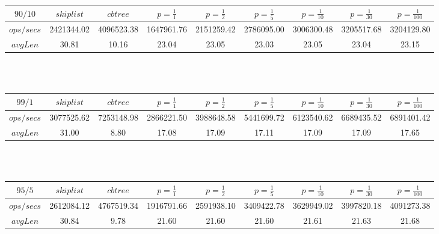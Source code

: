 \begin{tabular}{|c|c|c|c|c|c|c|c|c|}
$90/10$ & $skiplist$ & $cbtree$ & $p=\frac{1}{1}$ & $p=\frac{1}{2}$ & $p=\frac{1}{5}$ & $p=\frac{1}{10}$ & $p=\frac{1}{30}$ & $p=\frac{1}{100}$\\\hline
$ops/secs$ & 2421344.02 & 4096523.38 & 1647961.76 & 2151259.42 & 2786095.00 & 3006300.48 & 3205517.68 & 3204129.80\\\hline
$avgLen$ & 30.81 & 10.16 & 23.04 & 23.05 & 23.03 & 23.05 & 23.04 & 23.15\\\hline
\end{tabular}
\\\\
\begin{tabular}{|c|c|c|c|c|c|c|c|c|}
$99/1$ & $skiplist$ & $cbtree$ & $p=\frac{1}{1}$ & $p=\frac{1}{2}$ & $p=\frac{1}{5}$ & $p=\frac{1}{10}$ & $p=\frac{1}{30}$ & $p=\frac{1}{100}$\\\hline
$ops/secs$ & 3077525.62 & 7253148.98 & 2866221.50 & 3988648.58 & 5441699.72 & 6123540.62 & 6689435.52 & 6891401.42\\\hline
$avgLen$ & 31.00 & 8.80 & 17.08 & 17.09 & 17.11 & 17.09 & 17.09 & 17.65\\\hline
\end{tabular}
\\\\
\begin{tabular}{|c|c|c|c|c|c|c|c|c|}
$95/5$ & $skiplist$ & $cbtree$ & $p=\frac{1}{1}$ & $p=\frac{1}{2}$ & $p=\frac{1}{5}$ & $p=\frac{1}{10}$ & $p=\frac{1}{30}$ & $p=\frac{1}{100}$\\\hline
$ops/secs$ & 2612084.12 & 4767519.34 & 1916791.66 & 2591938.10 & 3409422.78 & 3629949.02 & 3997820.18 & 4091273.38\\\hline
$avgLen$ & 30.84 & 9.78 & 21.60 & 21.60 & 21.60 & 21.61 & 21.63 & 21.68\\\hline
\end{tabular}
\\\\
